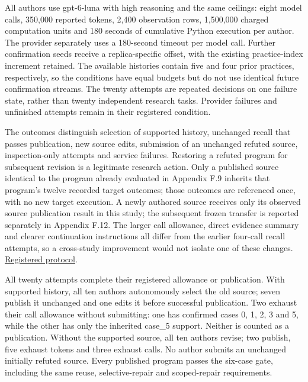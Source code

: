 \documentclass[11pt,a4paper]{article}
\begin{document}
All authors use gpt-6-luna with high reasoning and the same ceilings: eight model
calls, 350,000 reported tokens, 2,400 observation rows, 1,500,000 charged
computation units and 180 seconds of cumulative Python execution per author.
The provider separately uses a 180-second timeout per model call. Further confirmation seeds
receive a replica-specific offset, with the existing practice-index increment
retained. The available histories contain five and four prior practices,
respectively, so the conditions have equal budgets but do not use identical
future confirmation streams. The twenty attempts are repeated decisions on one
failure state, rather than twenty independent research tasks. Provider failures
and unfinished attempts remain in their registered condition.


The outcomes distinguish selection of supported history, unchanged recall that
passes publication, new source edits, submission of an unchanged refuted source,
inspection-only attempts and service failures. Restoring a refuted program for
subsequent revision is a legitimate research action. Only a published source
identical to the program already evaluated in Appendix F.9 inherits that program's
twelve recorded target outcomes; those outcomes are referenced once, with no new
target execution. A newly authored source receives only its observed source
publication result in this study; the subsequent frozen transfer is reported
separately in Appendix F.12. The larger call allowance, direct evidence
summary and clearer continuation instructions all differ from the earlier
four-call recall attempts, so a cross-study improvement would not isolate one
of these changes.
\hyperlink{artifact-97}{Registered protocol}.


All twenty attempts complete their registered allowance or publication. With
supported history, all ten authors autonomously select the old source; seven
publish it unchanged and one edits it before successful publication. Two exhaust
their call allowance without submitting: one has confirmed cases 0, 1, 2, 3 and 5,
while the other has only the inherited case\_5 support. Neither is counted as a
publication. Without the supported source, all ten authors revise; two publish,
five exhaust tokens and three exhaust calls. No author submits an unchanged
initially refuted source. Every published program passes the six-case gate,
including the same reuse, selective-repair and scoped-repair requirements.
\end{document}
